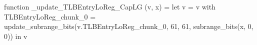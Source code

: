 function _update_TLBEntryLoReg_CapLG (v, x) = let v = { v with TLBEntryLoReg_chunk_0 = update_subrange_bits(v.TLBEntryLoReg_chunk_0, 61, 61, subrange_bits(x, 0, 0)) } in
  v
